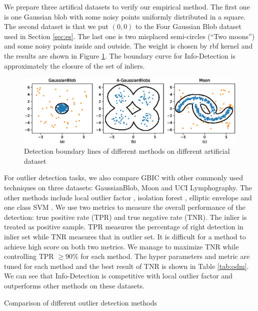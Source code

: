 We prepare three artifical datasets to verify our empirical method. The first one is one Gaussian blob with some noisy points uniformly distributed in a square. The second dataset is that we put $(0,0)$ to the Four Gaussian Blob dataset used in Section \ref{sec:es}. The last one is two misplaced semi-circles (``Two moons'') and some noisy points inside and outside. The weight is chosen by rbf kernel and the results are shown in Figure \ref{fig:boundary}. The boundary curve for Info-Detection is approximately the closure of the set of inliers.
\begin{figure}[!ht]
	\centering
	\includegraphics[width=\textwidth]{pic/outlier_boundary_illustration.eps}
	\caption{Detection boundary lines of different methods on different artificial dataset}	\label{fig:boundary}
\end{figure}

For outlier detection tasks, we also compare GBIC with other commonly used techniques on three datasets: GaussianBlob, Moon and UCI Lymphography. The other methods include local outlier factor \citep{Breunig}, isolation forest \citep{if}, elliptic envelope \citep{rousseeuw1999fast} and one class SVM \citep{svm}. We use two metrics to measure the overall performance of the detection: true positive rate (TPR) and true negative rate (TNR). The inlier is treated as positive sample. TPR measures the percentage of right detection in inlier set while TNR measures that in outlier set. It is difficult for a method to achieve high score on both two metrics. We manage to maximize TNR while controlling TPR $\geq 90\%$ for each method. The hyper parameters and metric are tuned for each method and the best result of TNR is shown in Table \ref{tab:odm}. We can see that Info-Detection is competitive with local outlier factor and outperforms other methods on these datasets.

\begin{table}
\centering

\caption{Comparison of different outlier detection methods}\label{tab:odm}
\end{table}

